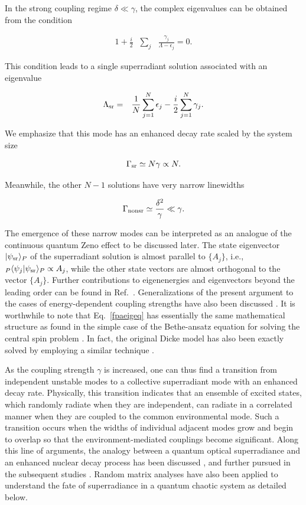 \documentclass{tADP2e}
\theoremstyle{plain}
\newcommand{\eqn}[1]{
\begin{eqnarray}
	#1
\end{eqnarray}
}
\theoremstyle{plain}
\theoremstyle{definition}
\begin{document}
In the strong coupling regime $\delta\ll\gamma$, the complex eigenvalues can be obtained from the condition
\eqn{\label{fpaeigeq}
1+\frac{i}{2} & \sum_{j} & \frac{\gamma_{j}}{\Lambda-\epsilon_{j}}=0.
}
This condition leads to a single superradiant solution associated with an eigenvalue 
 \eqn{\Lambda_{{\rm sr}} & = & \frac{1}{N}\sum_{j=1}^{N}\epsilon_{j}-\frac{i}{2}\sum_{j=1}^{N}\gamma_{j}.\label{fpasreig}
}
We emphasize that this mode has an enhanced decay rate scaled by the system size 
\eqn{\Gamma_{{\rm sr}}\simeq N\gamma\propto N.} 
Meanwhile, the other $N-1$ solutions have very narrow linewidths 
\eqn{\Gamma_{{\rm nonsr}}\simeq\frac{\delta^{2}}{\gamma}\ll\gamma.\label{fpanonrese}} 
The emergence of these narrow modes can be interpreted as an analogue of the continuous quantum Zeno effect to be discussed later. The state eigenvector $|\psi_{\rm sr}\rangle_P$ of the superradiant solution is almost parallel to $\{A_{{j}}\}$, i.e., $_{P}\langle \psi_{{j}}|\psi_{{\rm sr}}\rangle_P\propto A_{j}$, while the other state vectors are almost orthogonal to the vector  $\{A_{j}\}$. Further contributions to eigenenergies and eigenvectors beyond the leading order can be found in Ref.~\cite{FVV96}.  Generalizations of the present argument to the cases of energy-dependent coupling strengths have also been discussed \cite{VVS92,VA06}.  It is worthwhile to note that Eq.~\eqref{fpaeigeq} has essentially the same mathematical structure as found in the simple case of the Bethe-ansatz equation for solving the central spin problem \cite{BM07,YA19A}. In fact, the original Dicke model has also been exactly solved  by employing a similar technique \cite{TO10}. 

As the coupling strength $\gamma$ is increased, one can thus find a transition from independent unstable modes to a collective superradiant mode with an enhanced decay rate.
Physically, this transition indicates that an ensemble of excited states, which randomly radiate when they are independent, can radiate in a correlated manner when they are coupled to the common environmental mode. Such a transition occurs when the widths of individual adjacent modes grow and begin to overlap so that the environment-mediated couplings become significant. Along this line of arguments, the analogy between a quantum optical superradiance and an enhanced nuclear decay process has been discussed \cite{Rotter_1991},  and further pursued in the subsequent studies \cite{VA05,IR01}. Random matrix analyses have also been applied to understand the fate of superradiance in a quantum chaotic system as detailed below.
\end{document}
